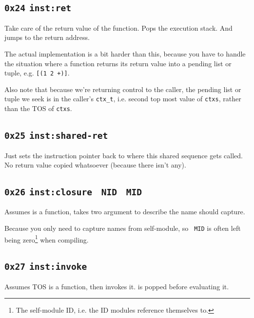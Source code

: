 \documentclass{report}
\newcommand{\mtilde}[1]{\textasciitilde}
\newcommand{\marg}[1]{\texttt{\mtilde ~#1}}
\newcommand{\inst}[1] {\texttt{inst:#1}}
\begin{document}
\subsection{\texttt{0x24} \inst{ret} }

Take care of the return value of the function. Pops the execution stack. And jumps to the return address.

\begin{mdframed}[style=detail]
  The actual implementation is a bit harder than this, because you have to handle the situation where a function returns its return value into a pending list or tuple, e.g. \texttt{[(1 2 +)]}.

Also note that because we're returning control to the caller, the pending list or tuple we seek is in the caller's \texttt{ctx\_t}, i.e. second top most value of \texttt{ctxs}, rather than the TOS of \texttt{ctxs}.
\end{mdframed}


\subsection{\texttt{0x25} \inst{shared-ret}}

Just sets the instruction pointer back to where this shared sequence gets called. No return value copied whatsoever (because there isn't any).

\subsection{\texttt{0x26} \inst{closure} \marg{NID} \marg{MID} }

Assumes  is a function, takes two argument to describe the name  should capture.

\begin{mdframed}[style=detail]
  Because you only need to capture names from self-module, so \marg{MID} is often left being zero\footnote{The self-module ID, i.e. the ID modules reference themselves to.} when compiling.
\end{mdframed}

\subsection{\texttt{0x27} \inst{invoke} }

Assumes TOS is a function, then invokes it.  is popped before evaluating it.
\end{document}
